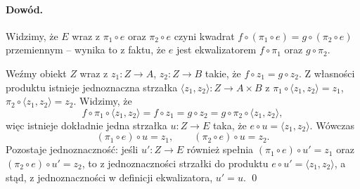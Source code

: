\paragraph{Dowód.}
Widzimy, że $E$ wraz z $\pi_1\circ e$ oraz $\pi_2\circ e$ czyni kwadrat $f\circ(\pi_1\circ e) = g\circ(\pi_2\circ e)$ przemiennym -- wynika to z faktu, że $e$ jest ekwalizatorem $f\circ\pi_1$ oraz $g\circ\pi_2$.

Weźmy obiekt $Z$ wraz z $z_1\colon Z\to A$, $z_2\colon Z\to B$ takie, że $f\circ z_1 = g\circ z_2$. Z własności produktu istnieje jednoznaczna strzałka $\langle z_1,z_2\rangle\colon Z\to A\times B$ z $\pi_1\circ\langle z_1,z_2\rangle = z_1$, $\pi_2\circ\langle z_1,z_2\rangle = z_2$. Widzimy, że
\[
f\circ \pi_1 \circ \langle z_1,z_2\rangle = f\circ z_1 = g\circ z_2 = g\circ \pi_2\circ\langle z_1,z_2\rangle,
\]
więc istnieje dokładnie jedna strzałka $u\colon Z\to E$ taka, że $e\circ u = \langle z_1,z_2\rangle$. Wówczas
\[
(\pi_1\circ e)\circ u = z_1, \qquad (\pi_2\circ e)\circ u = z_2.
\]
Pozostaje jednoznaczność: jeśli $u'\colon Z\to E$ również spełnia $(\pi_1\circ e)\circ u' = z_1$ oraz $(\pi_2\circ e)\circ u' = z_2$, to z jednoznaczności strzałki do produktu $e\circ u' = \langle z_1,z_2\rangle$, a stąd, z jednoznaczności w definicji ekwalizatora, $u' = u$. \qed
